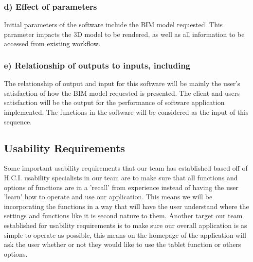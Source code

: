 \documentclass[onecolumn, draftclsnofoot,10pt, compsoc]{IEEEtran}
\begin{document}
        \subsubsection*{d) Effect of parameters}
        Initial parameters of the software include the BIM model requested. This parameter impacts the 3D model to be rendered, as well as all information to be accessed from existing workflow.\par
         \subsubsection*{e) Relationship of outputs to inputs, including} %
        
        The relationship of output and input for this software will be mainly the user's satisfaction of how the BIM model requested is presented. The client and users satisfaction will be the output for the performance of software application implemented. The functions in the software will be considered as the input of this sequence.
 

    \subsection{Usability Requirements}   
        Some important usability requirements that our team has established based off of H.C.I. usability specialists in our team are to make sure that all functions and options of functions are in a 'recall' from experience instead of having the user 'learn' how to operate and use our application. This means we will be incorporating the functions in a way that will have the user understand where the settings and functions like it is second nature to them. Another target our team established for usability requirements is to make sure our overall application is as simple to operate as possible, this means on the homepage of the application will ask the user whether or not they would like to use the tablet function or others options.
        
\end{document}
